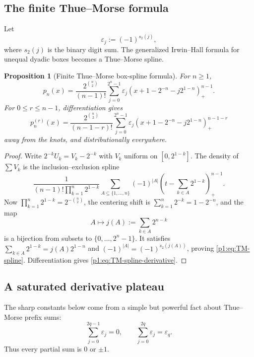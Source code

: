 \documentclass[11pt]{article}
\numberwithin{equation}{section}
\newtheorem{proposition}[theorem]{Proposition}
\theoremstyle{definition}
\theoremstyle{remark}
\newcommand{\pospart}[1]{\left(#1\right)_{+}}
\newcommand{\TM}{\varepsilon}
\begin{document}
\subsection{The finite Thue--Morse formula}

Let
\begin{equation}
 \TM_j:=(-1)^{s_2(j)},
 \label{p1:eq:TM-sign}
\end{equation}
where $s_2(j)$ is the binary digit sum.  The generalized Irwin--Hall formula for unequal dyadic boxes becomes a Thue--Morse spline.

\begin{proposition}[Finite Thue--Morse box-spline formula]
\label{p1:prop:TM-spline}
For $n\ge1$,
\begin{equation}
 \boxed{
 p_n(x)=\frac{2^{\binom n2}}{(n-1)!}
 \sum_{j=0}^{2^n-1}\TM_j
 \pospart{x+1-2^{-n}-j2^{1-n}}^{n-1}.}
 \label{p1:eq:TM-spline}
\end{equation}
For $0\le r\le n-1$, differentiation gives
\begin{equation}
 p_n^{(r)}(x)=\frac{2^{\binom n2}}{(n-1-r)!}
 \sum_{j=0}^{2^n-1}\TM_j
 \pospart{x+1-2^{-n}-j2^{1-n}}^{n-1-r}
 \label{p1:eq:TM-spline-derivative}
\end{equation}
away from the knots, and distributionally everywhere.
\end{proposition}

\begin{proof}
Write $2^{-k}U_k=V_k-2^{-k}$ with $V_k$ uniform on $[0,2^{1-k}]$.  The density of $\sum V_k$ is the inclusion--exclusion spline
\[
 \frac1{(n-1)!\prod_{k=1}^n2^{1-k}}
 \sum_{A\subseteq\{1,\ldots,n\}}(-1)^{|A|}
 \left(t-\sum_{k\in A}2^{1-k}\right)_+^{n-1}.
\]
Now \(\prod_{k=1}^n2^{1-k}=2^{-\binom n2}\), the centering shift is
\(\sum_{k=1}^n2^{-k}=1-2^{-n}\), and the map
\[
 A\longmapsto j(A):=\sum_{k\in A}2^{n-k}
\]
is a bijection from subsets to $\{0,\ldots,2^n-1\}$.  It satisfies
\(\sum_{k\in A}2^{1-k}=j(A)2^{1-n}\) and
\((-1)^{|A|}=(-1)^{s_2(j(A))}\), proving \eqref{p1:eq:TM-spline}.  Differentiation gives \eqref{p1:eq:TM-spline-derivative}.
\end{proof}

\subsection{A saturated derivative plateau}

The sharp constants below come from a simple but powerful fact about Thue--Morse prefix sums:
\begin{equation}
 \sum_{j=0}^{2q-1}\TM_j=0,
 \qquad
 \sum_{j=0}^{2q}\TM_j=\TM_q.
 \label{p1:eq:TM-prefix-two-valued}
\end{equation}
Thus every partial sum is $0$ or $\pm1$.
\end{document}
